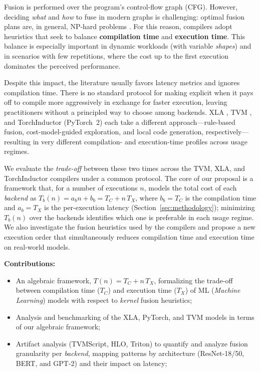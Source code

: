 \documentclass[sigconf,anonymous]{acmart}
\begin{document}
Fusion is performed over the program's control-flow graph (CFG). However, deciding \emph{what} and \emph{how} to fuse in modern graphs is challenging: optimal fusion plans are, in general, NP-hard problems \cite{darte1999,10.5555/645671.665526}. For this reason, compilers adopt heuristics that seek to balance \textbf{compilation time} and \textbf{execution time}. This balance is especially important in dynamic workloads (with variable \emph{shapes}) and in scenarios with few repetitions, where the cost up to the first execution dominates the perceived performance.

Despite this impact, the literature usually favors latency metrics and ignores compilation time. There is no standard protocol for making explicit when it pays off to compile more aggressively in exchange for faster execution, leaving practitioners without a principled way to choose among backends. XLA \cite{snider2023xla}, TVM \cite{chen2018tvm}, and TorchInductor (PyTorch~2) \cite{pytorch2022} each take a different approach---rule-based fusion, cost-model-guided exploration, and local code generation, respectively---resulting in very different compilation- and execution-time profiles across usage regimes.

We evaluate the \emph{trade-off} between these two times across the TVM, XLA, and TorchInductor compilers under a common protocol. The core of our proposal is a framework that, for a number of executions \(n\), models the total cost of each \emph{backend} as \(T_b(n)=a_b n + b_b = T_C + n\,T_X\), where \(b_b = T_C\) is the compilation time and \(a_b = T_X\) is the per-execution latency (Section~\ref{sec:methodology}); minimizing \(T_b(n)\) over the backends identifies which one is preferable in each usage regime. We also investigate the fusion heuristics used by the compilers and propose a new execution order that simultaneously reduces compilation time and execution time on real-world models.

\textbf{Contributions:}
\begin{itemize}
    \item An algebraic framework, \(T(n)=T_C+n\,T_X\), formalizing the trade-off between compilation time (\(T_C\)) and execution time (\(T_X\)) of ML (\textit{Machine Learning}) models with respect to \textit{kernel} fusion heuristics;
    \item Analysis and benchmarking of the XLA, PyTorch, and TVM models in terms of our algebraic framework;
    \item Artifact analysis (TVMScript, HLO, Triton) to quantify and analyze fusion granularity per \emph{backend}, mapping patterns by architecture (ResNet-18/50, BERT, and GPT-2) and their impact on latency;
\end{itemize}
\end{document}
